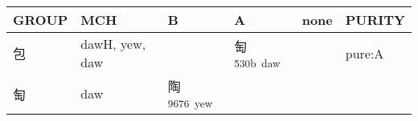 \documentclass[14pt,a4paper]{scrartcl}
\begin{document}
\begin{longtable}[c]{@{}llllll@{}}
\toprule
\begin{minipage}[b]{0.14\columnwidth}\raggedright\strut
GROUP
\strut\end{minipage} &
\begin{minipage}[b]{0.14\columnwidth}\raggedright\strut
MCH
\strut\end{minipage} &
\begin{minipage}[b]{0.14\columnwidth}\raggedright\strut
B
\strut\end{minipage} &
\begin{minipage}[b]{0.14\columnwidth}\raggedright\strut
A
\strut\end{minipage} &
\begin{minipage}[b]{0.14\columnwidth}\raggedright\strut
none
\strut\end{minipage} &
\begin{minipage}[b]{0.14\columnwidth}\raggedright\strut
PURITY
\strut\end{minipage}\tabularnewline
\midrule
\endhead
\begin{minipage}[t]{0.14\columnwidth}\raggedright\strut
包
\strut\end{minipage} &
\begin{minipage}[t]{0.14\columnwidth}\raggedright\strut
dawH, yew, daw
\strut\end{minipage} &
\begin{minipage}[t]{0.14\columnwidth}\raggedright\strut
\strut\end{minipage} &
\begin{minipage}[t]{0.14\columnwidth}\raggedright\strut
匋\textsuperscript{530b~daw}
\strut\end{minipage} &
\begin{minipage}[t]{0.14\columnwidth}\raggedright\strut
\strut\end{minipage} &
\begin{minipage}[t]{0.14\columnwidth}\raggedright\strut
pure:A
\strut\end{minipage}\tabularnewline
\begin{minipage}[t]{0.14\columnwidth}\raggedright\strut
匋
\strut\end{minipage} &
\begin{minipage}[t]{0.14\columnwidth}\raggedright\strut
daw
\strut\end{minipage} &
\begin{minipage}[t]{0.14\columnwidth}\raggedright\strut
陶\textsuperscript{9676~yew}
\strut\end{minipage} &

\end{longtable}
\end{document}
